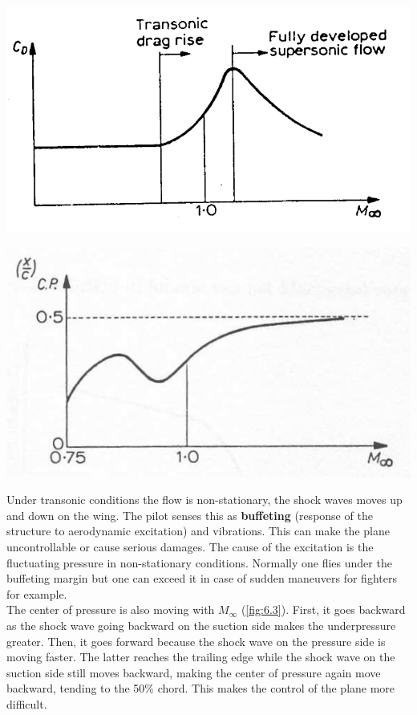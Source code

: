 	\begin{center}
	\begin{minipage}{0.3\textwidth}
	\includegraphics[scale=0.15]{ch6/2}
	\label{fig:6.2}
	\end{minipage}
	\begin{minipage}{0.3\textwidth}
	\includegraphics[scale=0.15]{ch6/3}
	\label{fig:6.3}
	\end{minipage}
	\end{center}
	
	Under transonic conditions the flow is non-stationary, the shock waves moves up and down on the wing. The pilot senses this as \textbf{buffeting} (response of the structure to aerodynamic excitation) and vibrations. This can make the plane uncontrollable or cause serious damages. The cause of the excitation is the fluctuating pressure in non-stationary conditions. Normally one flies under the buffeting margin but one can exceed it in case of sudden maneuvers for fighters for example. \\
	
	The center of pressure is also moving with $M_\infty$ (\autoref{fig:6.3}). First, it goes backward as the shock wave going backward on the suction side makes the underpressure greater. Then, it goes forward because the shock wave on the pressure side is moving faster. The latter reaches the trailing edge while the shock wave on the suction side still moves backward, making the center of pressure again move backward, tending to the 50\% chord. This makes the control of the plane more difficult. \\
	
